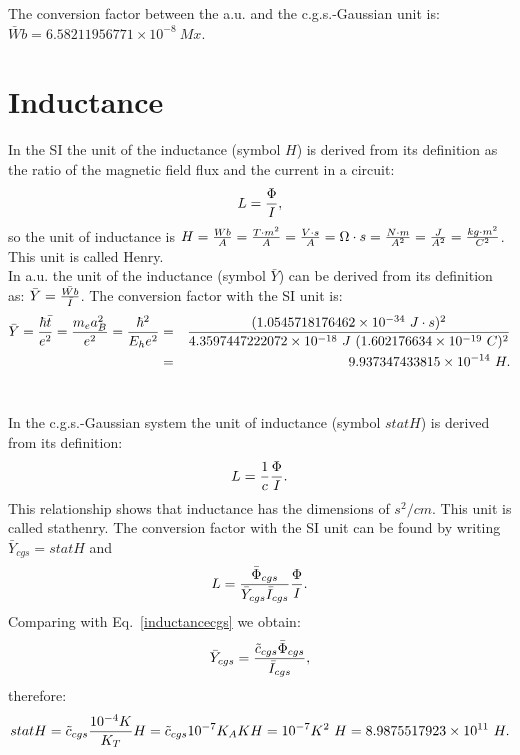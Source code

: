 \documentclass[12pt,a4paper]{article}
\def\hbarf{1.0545718176462\times 10^{-34}}
\def\e{1.602176634\times 10^{-19}}
\def\baru{4.3597447222072\times 10^{-18}}
\def\bary{9.937347433815\times 10^{-14}}
\def\ytoy{8.9875517923\times 10^{11}}
\def\barwbcgs{6.58211956771\times 10^{-8}}
\begin{document}
{\color{green} 
The conversion factor between the a.u. and the c.g.s.-Gaussian unit is: 
$\bar Wb = \barwbcgs\ Mx$.
}



\newpage
\section{\color{coral}Inductance}
In the SI the unit of the inductance (symbol $H$)
is derived from its definition as the ratio of the magnetic
field flux and the current in a circuit:
\begin{equation}
L={\Phi \over I},
\end{equation}
so the unit of inductance is $H={Wb \over A}={T \cdot m^2 \over A}=
{V\cdot s \over A} = \Omega \cdot s= {N \cdot m \over A^2}={J\over A^2}=
{kg\cdot m^2 \over C^2}$. This unit is called Henry. 
\\

{\color{web-blue} In a.u. the unit of the inductance (symbol $\bar Y$) 
can be derived from its definition as:
$\bar Y={\bar {Wb} \over \bar I}$. The conversion factor with the SI unit is:
\begin{eqnarray}
\bar Y = {\hbar \bar t\over e^2}={m_e a_B^2 \over e^2}={\hbar^2\over E_h e^2}
&=&{(\hbarf\ J\cdot s)^2 \over \baru\ J\ (\e\ C)^2}\nonumber \\
&=&\bary\ H.
\end{eqnarray}
\\
}

{\color{orange} In the c.g.s.-Gaussian system the unit of inductance
(symbol $statH$) is derived from its definition: 
\begin{equation}
L={1\over c} {\Phi \over I}.
\label{inductancecgs}
\end{equation}
This relationship shows that inductance has the dimensions of 
$s^2/cm$. This unit is called stathenry.
The conversion factor with the SI unit can be found by writing
$\bar Y_{cgs}=statH$ and 
\begin{equation}
L = {\bar \Phi_{cgs} \over \bar Y_{cgs} \bar I_{cgs}} {\Phi \over I}.
\end{equation}
Comparing with Eq.~\ref{inductancecgs} we obtain:
\begin{equation}
\bar Y_{cgs}= {\tilde c_{cgs} \bar \Phi_{cgs} \over \bar I_{cgs}},
\end{equation}
therefore:
\begin{equation}
statH=\tilde c_{cgs} {10^{-4} K \over K_T} H =
{\tilde c_{cgs}} {10^{-7} K_A K} H=
10^{-7} K^2\ H = \ytoy\ H.
\end{equation}
\\
}
\end{document}
